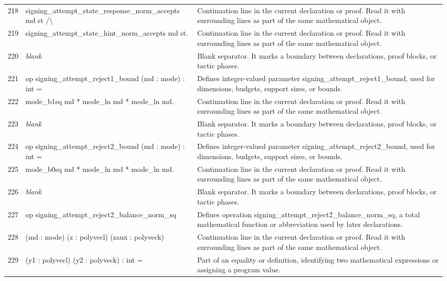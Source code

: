 \documentclass[10pt]{article}
\begin{document}
\begin{longtable}{r L{0.53\textwidth} L{0.37\textwidth}}
218 & {\ttfamily\scriptsize   signing\_attempt\_state\_response\_norm\_accepts md st /\textbackslash{}} & Continuation line in the current declaration or proof.  Read it with surrounding lines as part of the same mathematical object. \\
219 & {\ttfamily\scriptsize   signing\_attempt\_state\_hint\_norm\_accepts md st.} & Continuation line in the current declaration or proof.  Read it with surrounding lines as part of the same mathematical object. \\
220 & {\ttfamily\scriptsize \emph{blank}} & Blank separator.  It marks a boundary between declarations, proof blocks, or tactic phases. \\
221 & {\ttfamily\scriptsize op signing\_attempt\_reject1\_bound (md : mode) : int =} & Defines integer-valued parameter signing\_attempt\_reject1\_bound, used for dimensions, budgets, support sizes, or bounds. \\
222 & {\ttfamily\scriptsize   mode\_b1sq md * mode\_ln md * mode\_ln md.} & Continuation line in the current declaration or proof.  Read it with surrounding lines as part of the same mathematical object. \\
223 & {\ttfamily\scriptsize \emph{blank}} & Blank separator.  It marks a boundary between declarations, proof blocks, or tactic phases. \\
224 & {\ttfamily\scriptsize op signing\_attempt\_reject2\_bound (md : mode) : int =} & Defines integer-valued parameter signing\_attempt\_reject2\_bound, used for dimensions, budgets, support sizes, or bounds. \\
225 & {\ttfamily\scriptsize   mode\_b0sq md * mode\_ln md * mode\_ln md.} & Continuation line in the current declaration or proof.  Read it with surrounding lines as part of the same mathematical object. \\
226 & {\ttfamily\scriptsize \emph{blank}} & Blank separator.  It marks a boundary between declarations, proof blocks, or tactic phases. \\
227 & {\ttfamily\scriptsize op signing\_attempt\_reject2\_balance\_norm\_sq} & Defines operation signing\_attempt\_reject2\_balance\_norm\_sq, a total mathematical function or abbreviation used by later declarations. \\
228 & {\ttfamily\scriptsize    (md : mode) (z : polyvecl) (zaux : polyveck)} & Continuation line in the current declaration or proof.  Read it with surrounding lines as part of the same mathematical object. \\
229 & {\ttfamily\scriptsize    (y1 : polyvecl) (y2 : polyveck) : int =} & Part of an equality or definition, identifying two mathematical expressions or assigning a program value. \\

\end{longtable}
\end{document}
